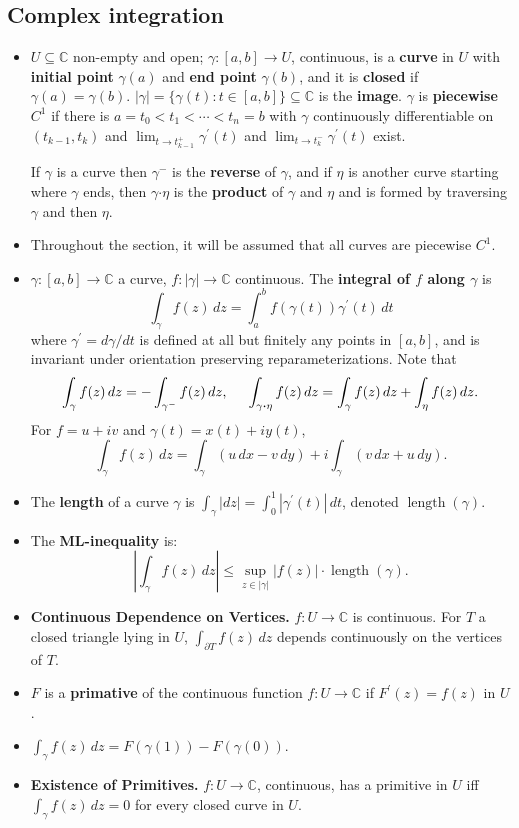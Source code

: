 \documentclass{article}
\DeclareMathOperator{\len}{length}
\newenvironment{topic}[1]{%
{\subsection{#1}}%
\begin{itemize}%
}{%
\end{itemize}%
}
\newcommand{\theorem}[1]{\item {\bf #1.}}
\newcommand{\term}[1]{{\bf #1}}
\newcommand{\remark}{\item}
\newcommand{\curveproduct}{\boldsymbol{\cdot}}
\begin{document}
\begin{topic}{Complex integration}

\remark $U \subseteq \mathbb{C}$ non-empty and open; $\gamma : [a, b] \to U$, continuous, is a \term{curve} in $U$ with \term{initial point} $\gamma(a)$ and \term{end point} $\gamma(b)$, and it is \term{closed} if $\gamma(a) = \gamma(b)$. $|\gamma| = \{ \gamma(t) : t \in [a, b] \} \subseteq \mathbb{C}$ is the \term{image}. $\gamma$ is \term{piecewise $C^1$} if there is $a = t_0 < t_1 < \cdots < t_n = b$ with $\gamma$ continuously differentiable on $(t_{k-1}, t_k)$ and $\lim_{t \to t_{k-1}^+} \gamma^\prime(t)$ and $\lim_{t \to t_k^-} \gamma^\prime(t)$ exist.

If $\gamma$ is a curve then $\gamma^-$ is the \term{reverse} of $\gamma$, and if $\eta$ is another curve starting where $\gamma$ ends, then $\gamma \curveproduct \eta$ is the \term{product} of $\gamma$ and $\eta$ and is formed by traversing $\gamma$ and then $\eta$.

\remark Throughout the section, it will be assumed that all curves are piecewise $C^1$.

\remark $\gamma : [a, b] \to \mathbb{C}$ a curve, $f : |\gamma| \to \mathbb{C}$ continuous. The \term{integral of $f$ along $\gamma$} is $$\int_\gamma f(z)\,dz = \int_a^b f(\gamma(t)) \gamma^\prime(t)\,dt$$ where $\gamma^\prime = d\gamma/dt$ is defined at all but finitely any points in $[a, b]$, and is invariant under orientation preserving reparameterizations. Note that $$\int_\gamma f(z)\,dz = - \int_{\gamma^-} f(z)\,dz, \hskip 0.5cm \int_{\gamma \curveproduct \eta} f(z)\,dz = \int_\gamma f(z)\,dz + \int_\eta f(z)\,dz.$$ For $f = u + iv$ and $\gamma(t) = x(t) + iy(t)$, $$\int_\gamma f(z)\,dz = \int_\gamma (u\,dx - v\,dy) + i \int_\gamma (v\,dx + u\,dy).$$

\remark The \term{length} of a curve $\gamma$ is $\int_\gamma |dz| = \int_0^1 |\gamma^\prime(t)|\,dt$, denoted $\len(\gamma)$.

\remark The \term{ML-inequality} is: $$\left|\int_\gamma f(z)\,dz\right| \leq \sup_{z \in |\gamma|} |f(z)| \cdot \len(\gamma).$$

\theorem{Continuous Dependence on Vertices} $f : U \to \mathbb{C}$ is continuous. For $T$ a closed triangle lying in $U$, $\int_{\partial T} f(z)\,dz$ depends continuously on the vertices of $T$.

\remark $F$ is a \term{primative} of the continuous function $f : U \to \mathbb{C}$ if $F^\prime(z) = f(z)$ in $U$.

\remark $\int_{\gamma} f(z)\,dz = F(\gamma(1)) - F(\gamma(0))$.

\theorem{Existence of Primitives} $f : U \to \mathbb{C}$, continuous, has a primitive in $U$ iff $\int_\gamma f(z)\, dz = 0$ for every closed curve in $U$.

\end{topic}
\end{document}
